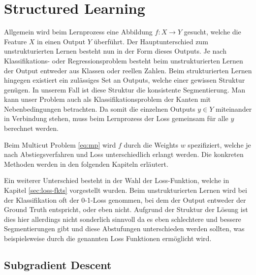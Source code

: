 \section{Structured Learning}\label{sec:strucLearn}

Allgemein wird beim Lernprozess eine Abbildung $f: X \rightarrow Y$ gesucht, welche die Feature $X$ in einen Output $Y$ überführt. Der Hauptunterschied zum unstrukturierten Lernen besteht nun in der Form dieses Outputs. Je nach Klassifikations- oder Regressionsproblem besteht beim unstrukturierten Lernen der Output entweder aus Klassen oder reellen Zahlen. Beim strukturierten Lernen hingegen existiert ein zulässiges Set an Outputs, welche einer gewissen Struktur genügen. In unserem Fall ist diese Struktur die konsistente Segmentierung. Man kann unser Problem auch als Klassifikationsproblem der Kanten mit Nebenbedingungen betrachten. Da somit die einzelnen Outputs $y \in Y$ miteinander in Verbindung stehen, muss beim Lernprozess der Loss gemeinsam für alle $y$ berechnet werden.

Beim Multicut Problem \eqref{eq:mp} wird $f$ durch die Weights $w$ spezifiziert, welche je nach Abstiegsverfahren und Loss unterschiedlich erlangt werden. Die konkreten Methoden werden in den folgenden Kapiteln erläutert. 

Ein weiterer Unterschied besteht in der Wahl der Loss-Funktion, welche in Kapitel \ref{sec:loss-fkts} vorgestellt wurden. Beim unstrukturierten Lernen wird bei der Klassifikation oft der 0-1-Loss genommen, bei dem der Output entweder der Ground Truth entspricht, oder eben nicht. Aufgrund der Struktur der Lösung ist dies hier allerdings nicht sonderlich sinnvoll da es eben schlechtere und bessere Segmentierungen gibt und diese Abstufungen unterschieden werden sollten, was beispielsweise durch die genannten Loss Funktionen ermöglicht wird.





\subsection{Subgradient Descent}

